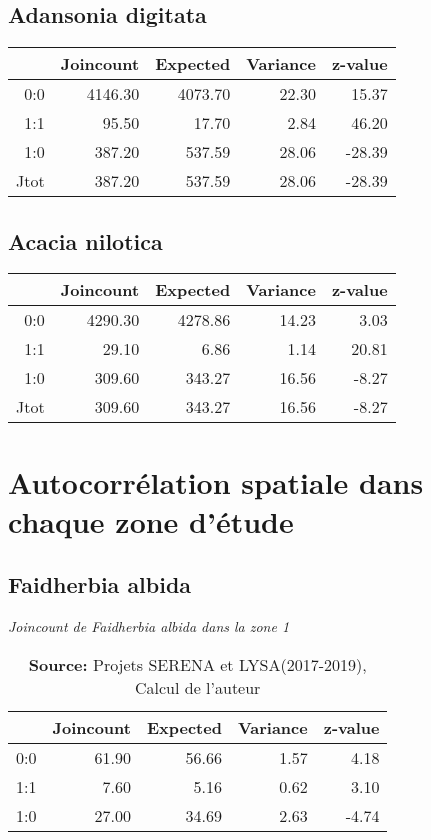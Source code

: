 \documentclass[a4paper, oneside, 12pt]{book}
\begin{document}
\subsection{Adansonia digitata}
\begin{table}[H]
	\centering
	\begin{tabular}{rrrrr}
		\hline
		& Joincount & Expected & Variance & z-value \\ 
		\hline
		0:0 & 4146.30 & 4073.70 & 22.30 & 15.37 \\ 
		1:1 & 95.50 & 17.70 & 2.84 & 46.20 \\ 
		1:0 & 387.20 & 537.59 & 28.06 & -28.39 \\ 
		Jtot & 387.20 & 537.59 & 28.06 & -28.39 \\ 
		\hline
	\end{tabular}
\end{table}
\subsection{Acacia nilotica}
\begin{table}[H]
	\centering
	\begin{tabular}{rrrrr}
		\hline
		& Joincount & Expected & Variance & z-value \\ 
		\hline
		0:0 & 4290.30 & 4278.86 & 14.23 & 3.03 \\ 
		1:1 & 29.10 & 6.86 & 1.14 & 20.81 \\ 
		1:0 & 309.60 & 343.27 & 16.56 & -8.27 \\ 
		Jtot & 309.60 & 343.27 & 16.56 & -8.27 \\ 
		\hline
	\end{tabular}
\end{table}
\section{Autocorrélation spatiale dans chaque zone d'étude}
\subsection{Faidherbia albida}
\begin{table}[H]
	\centering
	\caption{\textit{Joincount de Faidherbia albida dans la zone 1}}
	\begin{tabular}{|r|r|r|r|r|}
		\hline
		& Joincount & Expected & Variance & z-value \\ 
		\hline
		0:0 & 61.90 & 56.66 & 1.57 & 4.18 \\ 
		\hline
		1:1 & 7.60 & 5.16 & 0.62 & 3.10 \\ 
		\hline
		1:0 & 27.00 & 34.69 & 2.63 & -4.74 \\  
		\hline
	\end{tabular}
\caption*{\textbf{Source: }Projets SERENA et LYSA(2017-2019), Calcul de l'auteur}
\end{table}
\end{document}
